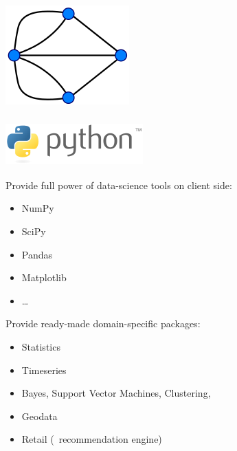 \documentclass[mathserif,usenames,dvipsnames]{beamer}
\begin{document}
\begin{frame}
\begin{center}
\raisebox{1cm}{\Huge $\rightarrow$}
\includegraphics[width=0.25\linewidth]{../img/kgraph.png}
\end{center}
\end{frame}

\begin{frame}
\frametitle{\includegraphics[width=0.2\linewidth]{../img/pythonlogo.png}}
Provide full power of data-science tools on client side:
\begin{itemize}
\item NumPy
\item SciPy
\item Pandas
\item Matplotlib
\item \dots
\end{itemize}
Provide ready-made domain-specific packages:
\begin{itemize}
\item Statistics
\item Timeseries
\item Bayes, Support Vector Machines, Clustering, \etc\
\item Geodata
\item Retail (\eg\ recommendation engine)
\end{itemize}
\end{frame}
\end{document}
